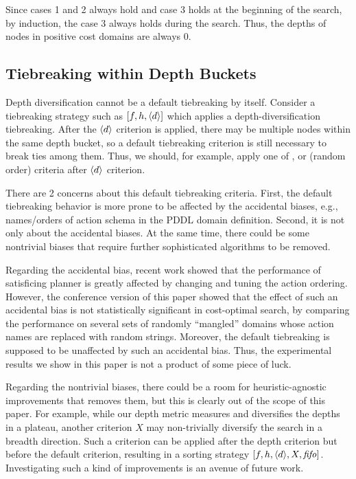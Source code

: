 Since cases 1 and 2 always hold and case 3 holds at the beginning of the search,
by induction, the case 3 always holds during the search.
Thus, the depths of nodes in positive cost domains are always 0.

\subsection{Tiebreaking within Depth Buckets}

Depth diversification cannot be a default tiebreaking by itself.
Consider a tiebreaking strategy such as $[f,h,{\left<d\right>}]$ which applies a depth-diversification tiebreaking.
After the ${\left<d\right>}$ criterion is applied, 
there may be multiple nodes within the same depth bucket, so a
default tiebreaking criterion is still necessary to break ties among them.
Thus, we should, for example, apply one of \lifo, \fifo or \ro (random order) criteria
after ${\left<d\right>}$ criterion.

There are 2 concerns about this default tiebreaking criteria.
First, the default tiebreaking behavior is more prone to be
affected by the accidental biases, e.g., names/orders of action schema in the PDDL domain definition.
Second, it is not only about the accidental biases.
At the same time, there could be some nontrivial biases that require further
sophisticated algorithms to be removed.

Regarding the accidental bias, recent work \cite{vallati2015effective} showed that the performance of satisficing
planner is greatly affected by changing and tuning the action ordering.
However, the conference version of this paper \cite{Asai2016} showed that
the effect of such an accidental bias is not statistically significant in cost-optimal search,
by comparing the performance on
several sets of randomly ``mangled'' domains whose action names are replaced with random strings.
Moreover, the \ro default tiebreaking is supposed to be unaffected by such an accidental bias.
Thus, the experimental results we show in this paper is not a product of some piece of luck.

Regarding the nontrivial biases, there could be a room for heuristic-agnostic improvements that removes them, but
this is clearly out of the scope of this paper.   For example, while our depth
metric measures and diversifies the depths in a plateau, another criterion $X$ may non-trivially diversify the
search in a breadth direction.  Such a criterion can be applied after the depth criterion but before the default criterion,
resulting in a sorting strategy $[f,h,{\left<d\right>},X,{\text{\textit{fifo}}}]$. Investigating such a kind of improvements is an avenue of
future work.

